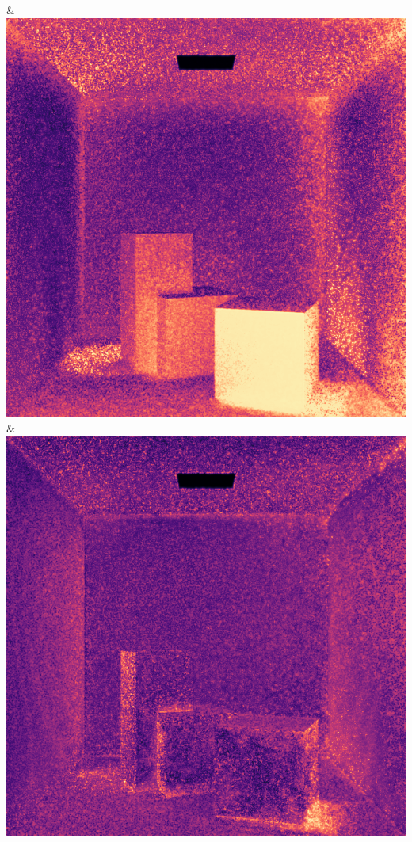 & \includegraphics[width=\linewidth]{figures/py/tests/quality_comparison/nrc+pt+sl_1spp_flip.png}
& \includegraphics[width=\linewidth]{figures/py/tests/quality_comparison/nrc+bt_1spp_flip.png}
